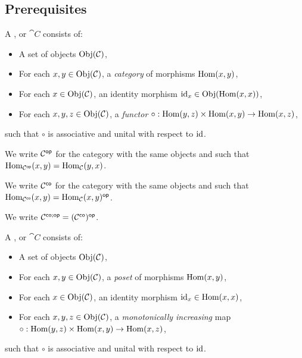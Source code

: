 \documentclass[a4paper]{memoir}
\begin{document}
\subsection{Prerequisites}
\begin{definition}
	A ,  or  $\cat C$ consists of:
	\begin{itemize}
		\item A set of objects $\mathrm{Obj}(\mathcal{C})$,
		\item For each $x, y \in \mathrm{Obj}(\mathcal{C})$, a \emph{category} of morphisms ${\mathrm{Hom}}(x, y)$,
		\item For each $x \in \mathrm{Obj}(\mathcal{C})$, an identity morphism $\mathrm{id}_x \in \mathrm{Obj}({\mathrm{Hom}}(x, x))$,
		\item For each $x, y, z \in \mathrm{Obj}(\mathcal{C})$, a \emph{functor} $\circ : {\mathrm{Hom}}(y, z) \times {\mathrm{Hom}}(x, y) \to {\mathrm{Hom}}(x, z)$,
	\end{itemize}
	such that $\circ$ is associative and unital with respect to $\mathrm{id}$.
	
	We write ${\mathcal{C}}^{\mathsf{op}}$ for the category with the same objects and such that ${\mathrm{Hom}}_{{\mathcal{C}}^{\mathsf{op}}}(x, y) = {\mathrm{Hom}}_{\mathcal{C}}(y, x)$.
	
	We write ${\mathcal{C}}^{\mathsf{co}}$ for the category with the same objects and such that ${\mathrm{Hom}}_{{\mathcal{C}}^{\mathsf{co}}}(x, y) = {\mathrm{Hom}}_{{\mathcal{C}}}(x, y)^{\mathsf{op}}$.
	
	We write ${\mathcal{C}}^{\mathsf{co};\mathsf{op}} = ({\mathcal{C}}^{\mathsf{co}})^{\mathsf{op}}$.
\end{definition}
\begin{definition}
	A ,  or  $\cat C$ consists of:
	\begin{itemize}
		\item A set of objects $\mathrm{Obj}(\mathcal{C})$,
		\item For each $x, y \in \mathrm{Obj}(\mathcal{C})$, a \emph{poset} of morphisms ${\mathrm{Hom}}(x, y)$,
		\item For each $x \in \mathrm{Obj}(\mathcal{C})$, an identity morphism $\mathrm{id}_x \in {\mathrm{Hom}}(x, x)$,
		\item For each $x, y, z \in \mathrm{Obj}(\mathcal{C})$, a \emph{monotonically increasing} map $\circ : {\mathrm{Hom}}(y, z) \times {\mathrm{Hom}}(x, y) \to {\mathrm{Hom}}(x, z)$,
	\end{itemize}
	such that $\circ$ is associative and unital with respect to $\mathrm{id}$.
\end{definition}
\end{document}

